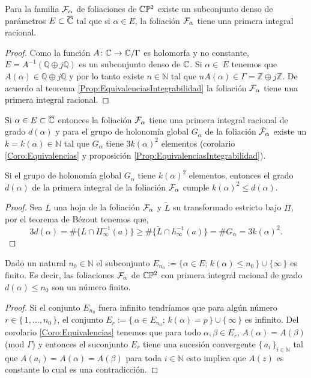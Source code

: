 \begin{Teorema}
\label{Teo:DensidadPrimerasIntegrales}
Para la familia $\mathcal{F}_{\alpha}$ de foliaciones de $\mathbb{C}\mathbb{P}^2$ existe un subconjunto denso de parámetros $E\subset\overline{\mathbb{C}}$ tal que si $\alpha\in E$, la foliación $\mathcal{F}_{\alpha}$ tiene una primera integral racional.
\end{Teorema}
\begin{proof}
Como la función $A\colon\mathbb{C}\rightarrow\mathbb{C}/\Gamma$ es holomorfa y no constante, $E=A^{-1}(\mathbb{Q}\oplus j\mathbb{Q})$ es un subconjunto denso de $\mathbb{C}$. Si $\alpha\in\ E$ tenemos que $A(\alpha)\in\mathbb{Q}\oplus j\mathbb{Q}$ y por lo tanto existe $n\in\mathbb{N}$ tal que $nA(\alpha)\in\Gamma=\mathbb{Z}\oplus j\mathbb{Z}$. De acuerdo al teorema \ref{Prop:EquivalenciasIntegrabilidad} la foliación $\mathcal{F}_{\alpha}$ tiene una primera integral racional.
\end{proof}

Si $\alpha\in E\subset\overline{\mathbb{C}}$ entonces la foliación $\mathcal{F}_{\alpha}$ tiene una primera integral racional de grado $d(\alpha)$ y para el grupo de holonomía global $G_{\alpha}$ de la foliación $\tilde{\mathcal{F}}_{\alpha}$ existe un $k=k(\alpha)\in\mathbb{N}$ tal que  $G_{\alpha}$ tiene $3k(\alpha)^{2}$ elementos (corolario \ref{Coro:Equivalencias} y proposición \ref{Prop:EquivalenciasIntegrabilidad}).

\begin{Lema}
\label{Lema:Cota}
Si el grupo de holonomía global $G_{\alpha}$ tiene $k(\alpha)^{2}$ elementos, entonces el grado $d(\alpha)$ de la primera integral de la foliación $\mathcal{F}_{\alpha}$ cumple $k(\alpha)^{2}\leq d(\alpha)$.
\end{Lema} 
\begin{proof}
Sea $L$ una hoja de la foliación $\mathcal{F}_{\alpha}$ y $\tilde{L}$ su transformado estricto bajo $\Pi$, por el teorema de Bézout tenemos que,
$$3d(\alpha)=\#\{L\cap H_{\infty}^{-1}(a)\}\geq\#\{\tilde{L}\cap h_{\infty}^{-1}(a)\}=\#G_{\alpha}=3k(\alpha)^{2}.$$
\end{proof}

\begin{Teorema}
\label{Teo:GradosGrandes}
Dado un natural $n_{0}\in\mathbb{N}$ el subconjunto $E_{n_{0}}:=\{\alpha\in E;\, k(\alpha)\leq n_{0}\, \}\cup\{\infty \, \}$ es finito. Es decir, las foliaciones $\mathcal{F}_{\alpha}$ de $\mathbb{C}\mathbb{P}^2$ con primera integral racional de grado $d(\alpha)\leq n_{0}$ son un número finito. 
\end{Teorema}
\begin{proof}
Si el conjunto $E_{n_{0}}$ fuera infinito tendríamos que para algún número $r\in\{\, 1,\ldots,n_{0} \, \}$, el conjunto $E_{r}:=\{\, \alpha\in E_{n_{0}};\, k(\alpha)=p \, \}\cup\{\, \infty\, \}$ es infinito. Del corolario \ref{Coro:Equivalencias} tenemos que para todo $\alpha,\beta\in E_{r}$, $A(\alpha)=A(\beta)$ (mod $\Gamma$) y entonces el suconjunto $E_{r}$ tiene una sucesión convergente $\{\, a_{i} \, \}_{i\in\mathbb{N}}$ tal que $A(a_{i})=A(\alpha)=A(\beta)$ para toda $i\in\mathbb{N}$ esto implica que $A(z)$ es constante lo cual es una contradicción.
\end{proof}

